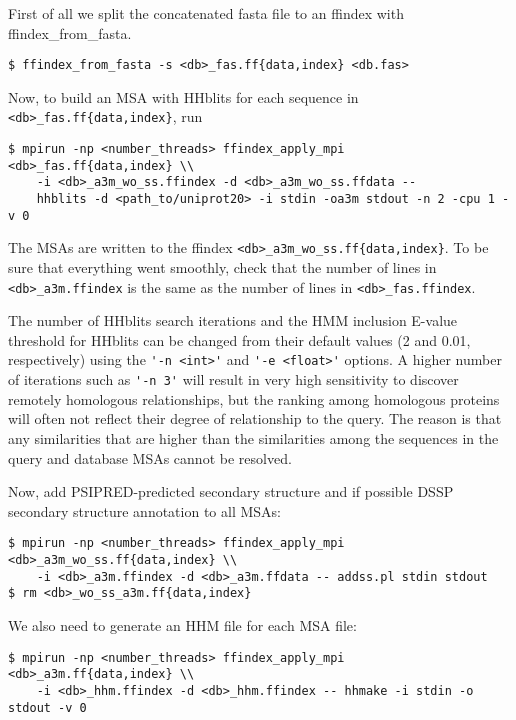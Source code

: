 \documentclass[11pt,a4paper]{article}
\begin{document}
First of all we split the concatenated fasta file to an ffindex with ffindex\_from\_fasta.

\begin{verbatim}
$ ffindex_from_fasta -s <db>_fas.ff{data,index} <db.fas> 
\end{verbatim}

Now, to build an MSA with HHblits for each sequence in \verb`<db>_fas.ff{data,index}`, run\\[-1mm]

\begin{verbatim}
$ mpirun -np <number_threads> ffindex_apply_mpi <db>_fas.ff{data,index} \\
    -i <db>_a3m_wo_ss.ffindex -d <db>_a3m_wo_ss.ffdata -- 
    hhblits -d <path_to/uniprot20> -i stdin -oa3m stdout -n 2 -cpu 1 -v 0
\end{verbatim}

The MSAs are written to the ffindex \verb`<db>_a3m_wo_ss.ff{data,index}`. To be sure that everything went smoothly, check that the number of lines in \verb`<db>_a3m.ffindex` is the same as the number of lines in \verb`<db>_fas.ffindex`. 

The number of HHblits search iterations and the HMM inclusion E-value threshold for HHblits can be changed from their default values (2 and 0.01, respectively) using the \verb`'-n <int>'` and \verb`'-e <float>'` options. A higher number of iterations such as  \verb`'-n 3'` will result in very high sensitivity to discover remotely homologous relationships, but the ranking among homologous proteins will often not reflect their degree of relationship to the query. The reason is that any similarities that are higher than the similarities among the sequences in the query and database MSAs cannot be resolved. 

Now, add PSIPRED-predicted secondary structure and if possible DSSP secondary structure annotation to all MSAs:
\begin{verbatim}
$ mpirun -np <number_threads> ffindex_apply_mpi <db>_a3m_wo_ss.ff{data,index} \\
    -i <db>_a3m.ffindex -d <db>_a3m.ffdata -- addss.pl stdin stdout 
$ rm <db>_wo_ss_a3m.ff{data,index}
\end{verbatim}

We also need to generate an HHM file for each MSA file:

\begin{verbatim}
$ mpirun -np <number_threads> ffindex_apply_mpi <db>_a3m.ff{data,index} \\
    -i <db>_hhm.ffindex -d <db>_hhm.ffindex -- hhmake -i stdin -o stdout -v 0
\end{verbatim}
\end{document}
